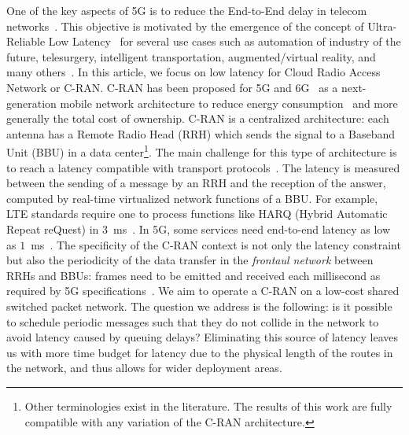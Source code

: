 \documentclass[a4paper,10pt]{journal}
\begin{document}
One of the key aspects of 5G is to reduce the End-to-End delay in telecom networks~\cite{dahlman20185g}. This objective is motivated by the emergence of the concept of Ultra-Reliable Low Latency~\cite{ali2021urllc} for several use cases such as automation of industry of the future, telesurgery, intelligent transportation, augmented/virtual reality, and many others~\cite{chen2018ultra}. In this article, we focus on low latency for Cloud Radio Access Network or C-RAN. C-RAN has been proposed for 5G and 6G~\cite{niknam2020intelligent} as a next-generation mobile network architecture to reduce energy consumption~\cite{gavrilovska2020cloud,mobile2011c,checko2014cloud} and more generally the total cost of ownership. C-RAN is a centralized architecture: each antenna has a Remote Radio Head (RRH) which sends the signal to a Baseband Unit (BBU) in a data center\footnote{Other terminologies exist in the literature. The results of this work are fully compatible with any variation of the C-RAN architecture.}. 
The main challenge for this type of architecture is to reach a latency compatible with transport protocols~\cite{ieeep802}. The latency is measured between the sending of a message by an RRH and the reception of the answer, computed by real-time virtualized network functions of a BBU. For example, LTE standards require one to process functions like HARQ (Hybrid Automatic Repeat reQuest) in $3$~ms~\cite{bouguen2012lte}. In 5G, some services need end-to-end latency as low as $1$~ms~\cite{dogra2020survey,3gpp5g,boccardi2014five}. The specificity of the C-RAN context is not only the latency constraint but also the periodicity of the data transfer in the \emph{frontaul network} between RRHs and BBUs: frames need to be emitted and received each millisecond as required by 5G specifications~\cite{bouguen2012lte,romano2019imt}. We aim to operate a C-RAN on a low-cost shared switched packet network.
The question we address is the following: is it possible to schedule periodic messages such that they do not collide in the network to avoid latency caused by queuing delays? Eliminating this source of latency leaves us with more time budget for latency due to the physical length of the routes in the network, and thus allows for wider deployment areas.
\end{document}
